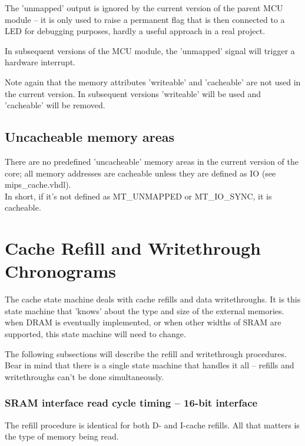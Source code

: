     The 'unmapped' output is ignored by the current version of the parent MCU 
    module -- it is only used to raise a permanent flag that is then connected
    to a LED for debugging purposes, hardly a useful approach in a real project.
    
    In subsequent versions of the MCU module, the 'unmapped' signal will trigger
    a hardware interrupt.
    
    Note again that the memory attributes 'writeable' and 'cacheable' are not
    used in the current version. In subsequent versions 'writeable' will be 
    used and 'cacheable' will be removed.
    
\subsection{Uncacheable memory areas}
\label{uncacheable_memory}

    There are no predefined 'uncacheable' memory areas in the current version of
    the core; all memory addresses are cacheable unless they are defined as
    IO (see mips\_cache.vhdl).\\
    In short, if it's not defined as MT\_UNMAPPED or MT\_IO\_SYNC, it is 
    cacheable.

\section{Cache Refill and Writethrough Chronograms}
\label{cache_state_machine}


The cache state machine deals with cache refills and data writethroughs. It is
this state machine that 'knows' about the type and size of the external 
memories. when DRAM is eventually implemented, or when other widths of SRAM are
supported, this state machine will need to change.

The following subsections will describe the refill and writethrough procedures.
Bear in mind that there is a single state machine that handles it all -- refills
and writethroughs can't be done simultaneously.


\subsubsection{SRAM interface read cycle timing -- 16-bit interface}
\label{sram_read_cycle_16b}

The refill procedure is identical for both D- and I-cache refills. All that 
matters is the type of memory being read. 



